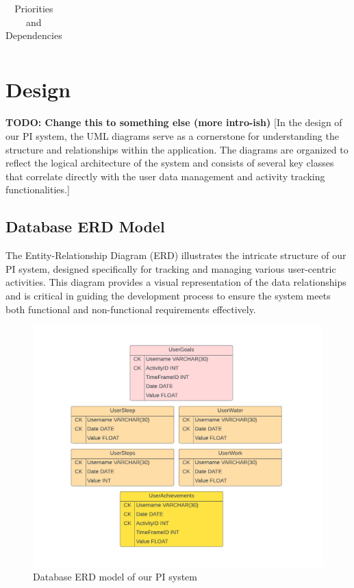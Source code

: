 \documentclass[12pt]{article}
\begin{document}
\begin{table}[!ht]
\begin{center}
\begin{tabular}{|l|c|c|c|}
\end{tabular}
\caption{Priorities and Dependencies}
\label{tab:priorities_dependencies}
\end{center}
\end{table}


\newpage
\section{Design}

\textbf{TODO: Change this to something else (more intro-ish)}
[In the design of our PI system, the UML diagrams serve as a cornerstone for
understanding the structure and relationships within the application. The
diagrams are organized to reflect the logical architecture of the system and
consists of several key classes that correlate directly with the user data
management and activity tracking functionalities.]\par

\subsection{Database ERD Model}

The Entity-Relationship Diagram (ERD) illustrates the intricate structure of
our PI system, designed specifically for tracking and managing various
user-centric activities. This diagram provides a visual representation of the
data relationships and is critical in guiding the development process to ensure
the system meets both functional and non-functional requirements
effectively.\par


\begin{figure}[!ht]
  \centering
  \includegraphics[width = 0.7\linewidth]{PI Systems Database}
  \caption{Database ERD model of our PI system}
  \label{fig:PI_ERD}
\end{figure}
\end{document}
